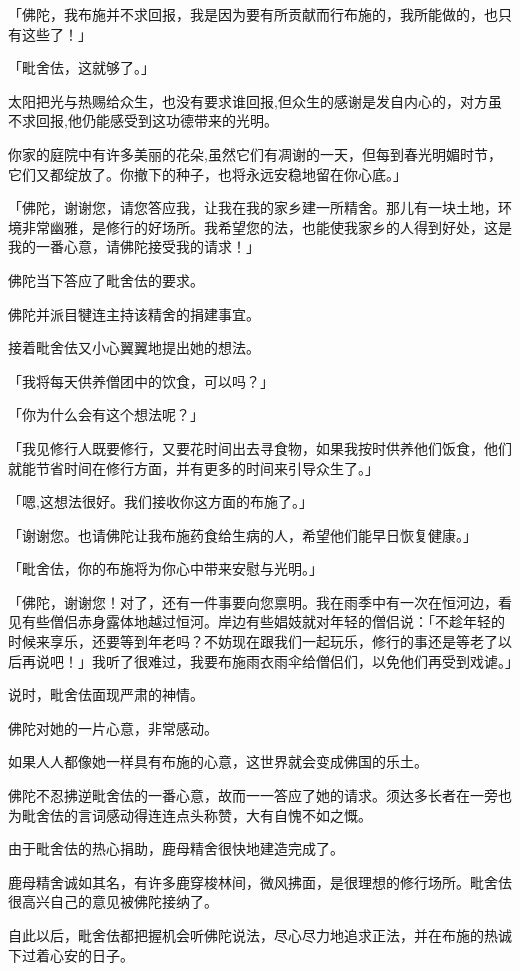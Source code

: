 \documentclass[twoside,openany]{book}
\begin{document}
「佛陀，我布施并不求回报，我是因为要有所贡献而行布施的，我所能做的，也只有这些了！」

「毗舍佉，这就够了。」

太阳把光与热赐给众生，也没有要求谁回报,但众生的感谢是发自内心的，对方虽不求回报,他仍能感受到这功德带来的光明。

你家的庭院中有许多美丽的花朵,虽然它们有凋谢的一天，但每到春光明媚时节，它们又都绽放了。你撤下的种子，也将永远安稳地留在你心底。」

「佛陀，谢谢您，请您答应我，让我在我的家乡建一所精舍。那儿有一块土地，环境非常幽雅，是修行的好场所。我希望您的法，也能使我家乡的人得到好处，这是我的一番心意，请佛陀接受我的请求！」

佛陀当下答应了毗舍佉的要求。

佛陀并派目犍连主持该精舍的捐建事宜。

接着毗舍佉又小心翼翼地提出她的想法。

「我将每天供养僧团中的饮食，可以吗？」

「你为什么会有这个想法呢？」

「我见修行人既要修行，又要花时间出去寻食物，如果我按时供养他们饭食，他们就能节省时间在修行方面，并有更多的时间来引导众生了。」

「嗯,这想法很好。我们接收你这方面的布施了。」

「谢谢您。也请佛陀让我布施药食给生病的人，希望他们能早日恢复健康。」

「毗舍佉，你的布施将为你心中带来安慰与光明。」

「佛陀，谢谢您！对了，还有一件事要向您禀明。我在雨季中有一次在恒河边，看见有些僧侣赤身露体地越过恒河。岸边有些娼妓就对年轻的僧侣说：「不趁年轻的时候来享乐，还要等到年老吗？不妨现在跟我们一起玩乐，修行的事还是等老了以后再说吧！」我听了很难过，我要布施雨衣雨伞给僧侣们，以免他们再受到戏谑。」

说时，毗舍佉面现严肃的神情。

佛陀对她的一片心意，非常感动。

如果人人都像她一样具有布施的心意，这世界就会变成佛国的乐土。

佛陀不忍拂逆毗舍佉的一番心意，故而一一答应了她的请求。须达多长者在一旁也为毗舍佉的言词感动得连连点头称赞，大有自愧不如之慨。

由于毗舍佉的热心捐助，鹿母精舍很快地建造完成了。

鹿母精舍诚如其名，有许多鹿穿梭林间，微风拂面，是很理想的修行场所。毗舍佉很高兴自己的意见被佛陀接纳了。

自此以后，毗舍佉都把握机会听佛陀说法，尽心尽力地追求正法，并在布施的热诚下过着心安的日子。
\end{document}
